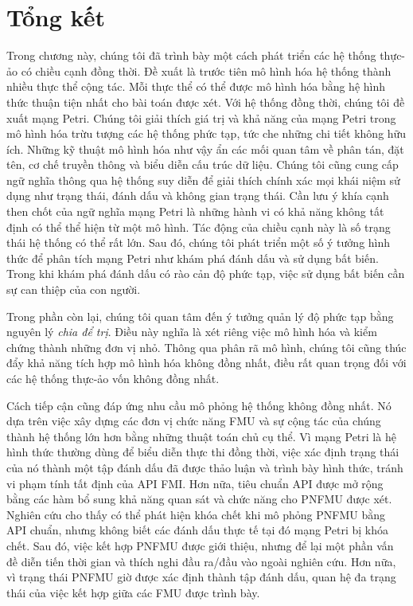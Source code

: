 \section{Tổng kết}
Trong chương này, chúng tôi đã trình bày một cách phát triển các hệ thống thực-ảo có chiều cạnh đồng thời. Đề xuất là trước tiên mô hình hóa hệ thống thành nhiều thực thể cộng tác. Mỗi thực thể có thể được mô hình hóa bằng hệ hình thức thuận tiện nhất cho bài toán được xét. Với hệ thống đồng thời, chúng tôi đề xuất mạng Petri. Chúng tôi giải thích giá trị và khả năng của mạng Petri trong mô hình hóa trừu tượng các hệ thống phức tạp, tức che những chi tiết không hữu ích. Những kỹ thuật mô hình hóa như vậy ẩn các mối quan tâm về phân tán, đặt tên, cơ chế truyền thông và biểu diễn cấu trúc dữ liệu. Chúng tôi cũng cung cấp ngữ nghĩa thông qua hệ thống suy diễn để giải thích chính xác mọi khái niệm sử dụng như trạng thái, đánh dấu và không gian trạng thái. Cần lưu ý khía cạnh then chốt của ngữ nghĩa mạng Petri là những hành vi có khả năng không tất định có thể thể hiện từ một mô hình. Tác động của chiều cạnh này là số trạng thái hệ thống có thể rất lớn. Sau đó, chúng tôi phát triển một số ý tưởng hình thức để phân tích mạng Petri như khám phá đánh dấu và sử dụng bất biến. Trong khi khám phá đánh dấu có rào cản độ phức tạp, việc sử dụng bất biến cần sự can thiệp của con người.

Trong phần còn lại, chúng tôi quan tâm đến ý tưởng quản lý độ phức tạp bằng nguyên lý \emph{chia để trị}. Điều này nghĩa là xét riêng việc mô hình hóa và kiểm chứng thành những đơn vị nhỏ. Thông qua phân rã mô hình, chúng tôi cũng thúc đẩy khả năng tích hợp mô hình hóa không đồng nhất, điều rất quan trọng đối với các hệ thống thực-ảo vốn không đồng nhất.

Cách tiếp cận cũng đáp ứng nhu cầu mô phỏng hệ thống không đồng nhất. Nó dựa trên việc xây dựng các đơn vị chức năng FMU và sự cộng tác của chúng thành hệ thống lớn hơn bằng những thuật toán chủ cụ thể. Vì mạng Petri là hệ hình thức thường dùng để biểu diễn thực thi đồng thời, việc xác định trạng thái của nó thành một tập đánh dấu đã được thảo luận và trình bày hình thức, tránh vi phạm tính tất định của API FMI. Hơn nữa, tiêu chuẩn API được mở rộng bằng các hàm bổ sung khả năng quan sát và chức năng cho PNFMU được xét. Nghiên cứu cho thấy có thể phát hiện khóa chết khi mô phỏng PNFMU bằng API chuẩn, nhưng không biết các đánh dấu thực tế tại đó mạng Petri bị khóa chết. Sau đó, việc kết hợp PNFMU được giới thiệu, nhưng để lại một phần vấn đề diễn tiến thời gian và thích nghi đầu ra/đầu vào ngoài nghiên cứu. Hơn nữa, vì trạng thái PNFMU giờ được xác định thành tập đánh dấu, quan hệ đa trạng thái của việc kết hợp giữa các FMU được trình bày.

